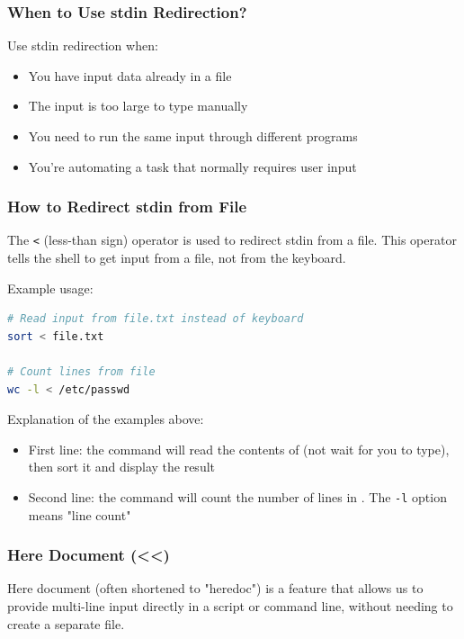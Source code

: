 \subsubsection{When to Use stdin Redirection?}

Use stdin redirection when:
\begin{itemize}
	\item You have input data already in a file
	\item The input is too large to type manually
	\item You need to run the same input through different programs
	\item You're automating a task that normally requires user input
\end{itemize}

\subsubsection{How to Redirect stdin from File}

The \texttt{<} (less-than sign) operator is used to redirect stdin from a file. This operator tells the shell to get input from a file, not from the keyboard.

Example usage:

\begin{lstlisting}[language=bash, caption={Redirecting stdin from file}]
# Read input from file.txt instead of keyboard
sort < file.txt

# Count lines from file
wc -l < /etc/passwd
\end{lstlisting}

Explanation of the examples above:
\begin{itemize}
	\item First line: the  command will read the contents of  (not wait for you to type), then sort it and display the result
	\item Second line: the  command will count the number of lines in . The \texttt{-l} option means "line count"
\end{itemize}

\subsubsection{Here Document (<<)}

Here document (often shortened to "heredoc") is a feature that allows us to provide multi-line input directly in a script or command line, without needing to create a separate file.

